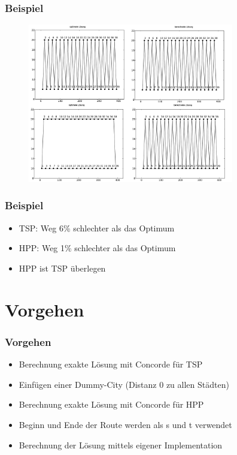 \documentclass[12pt]{beamer}
\begin{document}
    \begin{frame}
    \frametitle{Beispiel}
        \begin{figure}[H]
	    \centering
	        \includegraphics[width=9cm]{gfx/zz_comparison}
        \end{figure}
    \end{frame}

    \begin{frame}
        \frametitle{Beispiel}
	    \begin{itemize}
                \item TSP: Weg 6\% schlechter als das Optimum
                \item HPP: Weg 1\% schlechter als das Optimum
                \item HPP ist TSP überlegen
            \end{itemize}
    \end{frame}

    \section{Vorgehen}
    \begin{frame}
        \frametitle{Vorgehen}
	    \begin{itemize}
                \item Berechnung exakte Lösung mit Concorde für TSP
                \item Einfügen einer Dummy-City (Distanz 0 zu allen Städten)
                \item Berechnung exakte Lösung mit Concorde für HPP
                \item Beginn und Ende der Route werden als s und t verwendet
                \item Berechnung der Lösung mittels eigener Implementation
            \end{itemize}
    \end{frame}
\end{document}
